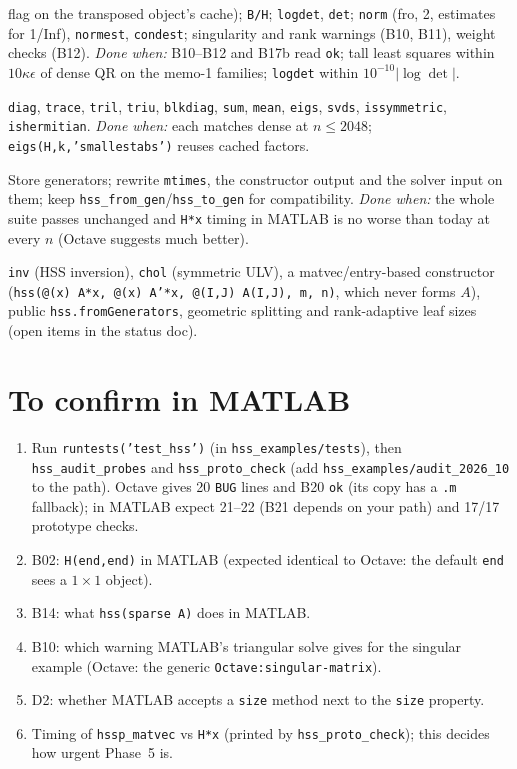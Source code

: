 \documentclass[11pt]{article}
\newcommand{\code}[1]{\texttt{#1}}
\begin{document}
\begin{description}[leftmargin=1.2em,style=nextline]
flag on the transposed object's cache);
\code{B/H}; \code{logdet}, \code{det}; \code{norm} (fro, 2, estimates for 1/Inf), \code{normest},
\code{condest}; singularity and rank warnings (B10, B11), weight checks (B12).
\emph{Done when:} B10--B12 and B17b read \code{ok}; tall least squares within
$10\kappa\epsilon$ of dense QR on the memo-1 families; \code{logdet} within $10^{-10}|\log\det|$.
\item[Phase 4: structure and spectra (small).] \code{diag}, \code{trace}, \code{tril}, \code{triu},
\code{blkdiag}, \code{sum}, \code{mean}, \code{eigs}, \code{svds}, \code{issymmetric}, \code{ishermitian}.
\emph{Done when:} each matches dense at $n\le2048$; \code{eigs(H,k,'smallestabs')} reuses cached factors.
\item[Phase 5: flat generator storage (large, optional; D3).] Store generators; rewrite \code{mtimes},
the constructor output and the solver input on them; keep \code{hss\_from\_gen}/\code{hss\_to\_gen} for
compatibility. \emph{Done when:} the whole suite passes unchanged and \code{H*x} timing in MATLAB is no worse
than today at every $n$ (Octave suggests much better).
\item[Phase 6: later.] \code{inv} (HSS inversion), \code{chol} (symmetric ULV), a matvec/entry-based constructor
(\code{hss(@(x) A*x, @(x) A'*x, @(I,J) A(I,J), m, n)}, which never forms $A$), public
\code{hss.fromGenerators}, geometric splitting and rank-adaptive leaf sizes (open items in the status doc).
\end{description}

\section{To confirm in MATLAB}\label{sec:matlab}
\begin{enumerate}
\item Run \code{runtests('test\_hss')} (in \code{hss\_examples/tests}), then \code{hss\_audit\_probes} and
\code{hss\_proto\_check} (add \code{hss\_examples/audit\_2026\_10} to the path). Octave gives 20 \code{BUG} lines and
B20 \code{ok} (its copy has a \code{.m} fallback); in MATLAB expect 21--22 (B21 depends on your path) and 17/17
prototype checks.
\item B02: \code{H(end,end)} in MATLAB (expected identical to Octave: the default \code{end} sees a $1\times1$
object).
\item B14: what \code{hss(sparse A)} does in MATLAB.
\item B10: which warning MATLAB's triangular solve gives for the singular example (Octave: the generic
\code{Octave:singular-matrix}).
\item D2: whether MATLAB accepts a \code{size} method next to the \code{size} property.
\item Timing of \code{hssp\_matvec} vs \code{H*x} (printed by \code{hss\_proto\_check}); this decides how urgent
Phase~5 is.
\end{enumerate}
\end{document}

